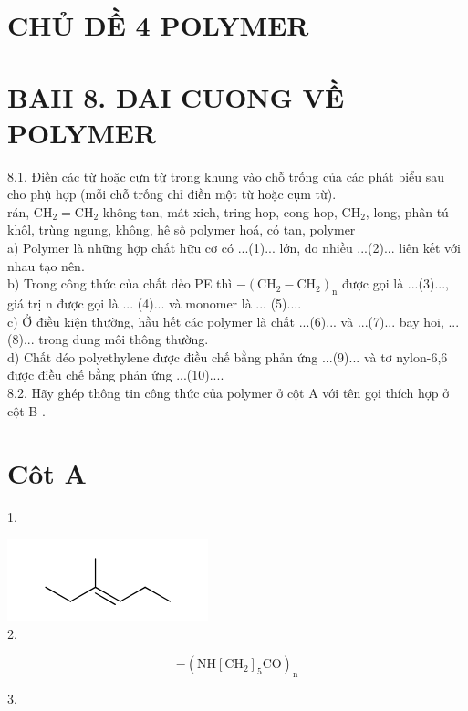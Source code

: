 \documentclass[10pt]{article}
\begin{document}
\section*{CHỦ DỀ 4 POLYMER}
\section*{BAII 8. DAI CUONG VỀ POLYMER}
8.1. Điền các từ hoặc cưn từ trong khung vào chỗ trống của các phát biểu sau cho phụ̀ hợp (mỗi chỗ trống chỉ điền một từ hoặc cụm từ).\\
rán, $\mathrm{CH}_{2}=\mathrm{CH}_{2}$ không tan, mát xich, tring hop, cong hop, $\mathrm{CH}_{2}$, long, phân tú khôl, trùng ngung, không, hê số polymer hoá, có tan, polymer\\
a) Polymer là những hợp chất hữu cơ có ...(1)... lớn, do nhiều ...(2)... liên kết với nhau tạo nên.\\
b) Trong công thức của chất dẻo PE thì $-\left(\mathrm{CH}_{2}-\mathrm{CH}_{2}\right)_{\mathrm{n}}$ được gọi là ...(3)..., giá trị n được gọi là ... (4)... và monomer là ... (5)....\\
c) Ở điều kiện thường, hầu hết các polymer là chất ...(6)... và ...(7)... bay hoi, ...(8)... trong dung môi thông thường.\\
d) Chất déo polyethylene được điều chế bằng phản ứng ...(9)... và tơ nylon-6,6 được điều chế bằng phản ứng ...(10)....\\
8.2. Hãy ghép thông tin công thức của polymer ở cột A với tên gọi thích hợp ở cột B .

\section*{Côt A}
1.

\includegraphics{smile-39d46c01f47b85c0d4dbb475b16ebf35911e8222}\\
2.

$$
-\left(\mathrm{NH}\left[\mathrm{CH}_{2}\right]_{5} \mathrm{CO}\right)_{\mathrm{n}}
$$

3.
\end{document}
